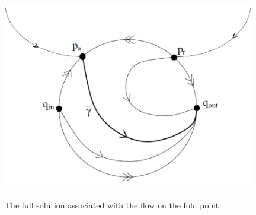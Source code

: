 %		

\begin{figure}[h!]\centering
	\includegraphics[height=9cm,width=11cm]{Images/blow-up}
	\caption{The full solution associated with the flow on the fold point.}
	\label{fig: full solution fold}
\end{figure}

























